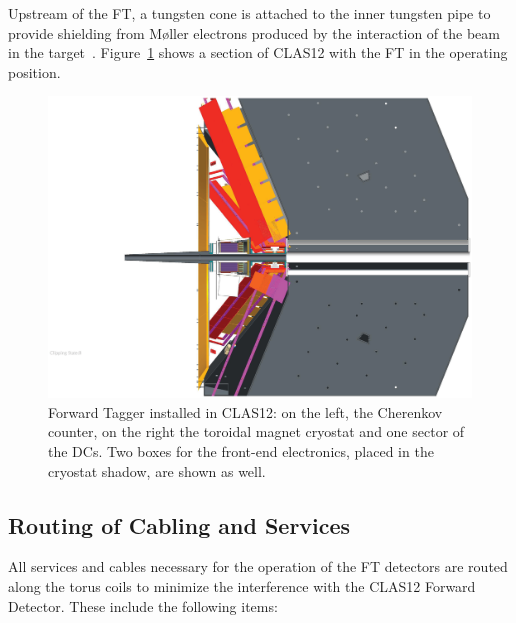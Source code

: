 Upstream of the FT, a tungsten cone is attached to the inner tungsten pipe to provide shielding from M{\o}ller
electrons produced by the interaction of the beam in the target~\cite{beamline}. Figure~\ref{fig:integra} shows a
section of CLAS12 with the FT in the operating position.

\begin{figure}
\includegraphics[width=1.0\columnwidth]{./fig/IC_integra.eps}
\caption{Forward Tagger installed in CLAS12: on the left, the Cherenkov counter, on the right the toroidal magnet
  cryostat and one sector of the DCs. Two boxes for the front-end electronics, placed in the cryostat shadow, are
  shown as well.}
\label{fig:integra}
\end{figure}

\subsection{Routing of Cabling and Services}

All services and cables necessary for the operation of the FT detectors are routed along the torus coils to minimize
the interference with the CLAS12 Forward Detector. These include the following items:

